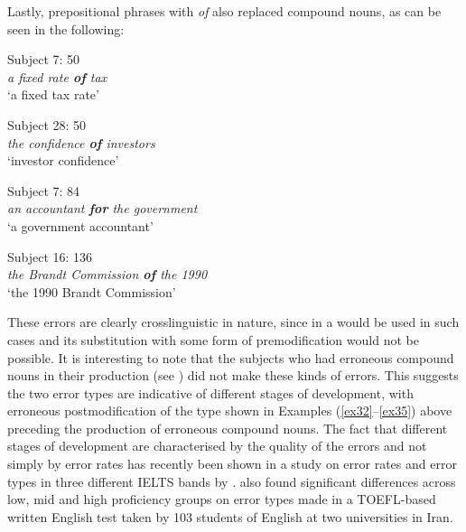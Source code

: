 \documentclass[output=paper]{langsci/langscibook}
\begin{document}
Lastly,  prepositional phrases with \textit{of} also
replaced compound nouns, as can be seen in the following:



\begin{exe}  
  \ex{}
  {Subject 7: 50}\\
    \textit{a fixed rate \textbf{of} tax}\\
    {‘a fixed tax rate’}
  \label{ex32}
\end{exe}


\begin{exe}  
  \ex{}
  {Subject 28: 50}\\
    \textit{the confidence \textbf{of} investors}\\
    {‘investor confidence’}
  \label{ex33}
\end{exe}

\begin{exe}  
  \ex{}
  {Subject 7: 84}\\
    \textit{an accountant \textbf{for} the government}\\
    {‘a government accountant’}
  \label{ex34}
\end{exe}

\begin{exe}  
  \ex{}
  {Subject 16: 136}\\
    \textit{the Brandt Commission \textbf{of} the 1990}\\
    {‘the 1990 Brandt Commission’}
  \label{ex35}
\end{exe}

These errors are clearly crosslinguistic in nature, since in  a
  would be used in such cases and its
substitution with some form of premodification would not be
possible. It is interesting to note that the subjects who had
erroneous compound nouns in their production (see
) did not make these kinds of errors. This
suggests the two error types are indicative of different stages of
development, with erroneous postmodification of the type shown in
Examples (\ref{ex32}--\ref{ex35}) above preceding the production of erroneous compound
nouns. The fact that different stages of development are characterised
by the quality of the errors and not simply by error rates has
recently been shown in a study on error rates and error types in three
different IELTS bands by \citet{Muller2015}. \citet{NezamiNajafi2012}
also found significant differences across low, mid and high
proficiency groups on error types made in a TOEFL-based written
English test taken by 103  students of English at two
universities in Iran.
\end{document}
